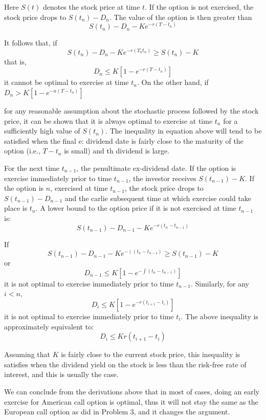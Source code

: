 \documentclass[letterpaper]{article}
\begin{document}
		Here $S(t)$ denotes the stock price at time $t$. If the option is not exercised, the stock price drops to $S\left(t_n\right)-D_n$. The value of the option is then greater than
		$$
		S\left(t_n\right)-D_n-K e^{-r\left(T-t_n\right)}
		$$
		
		It follows that, if
		$$
		S\left(t_n\right)-D_n-K e^{-r\left(T_n t_n\right)} \geqslant S\left(t_n\right)-K
		$$
		that is,
		$$
		D_n \leqslant K\left[1-e^{-r\left(T-t_n\right)}\right]
		$$
		it cannot be optimal to exercise at time $t_n$. On the other hand, if $
		D_n>K\left[1-e^{-n\left(T-t_n\right)}\right]$
		
		for any reasonable assumption about the stochastic process followed by the stock price, it can be shown that it is always optimal to exercise at time $t_n$ for a sufficiently high value of $S\left(t_n\right)$. The inequality in equation above will tend to be satisfied when the final e: dividend date is fairly close to the maturity of the option (i.e., $T-t_n$ is small) and th dividend is large.
		
		For the next time $t_{n-1}$, the penultimate ex-dividend date. If the option is exercise immediately prior to time $t_{n-1}$, the investor receives $S\left(t_{n-1}\right)-K$. If the option is $n$, exercised at time $t_{n-1}$, the stock price drops to $S\left(t_{n-1}\right)-D_{n-1}$ and the carlie subsequent time at which exercise could take place is $t_n$.  A lower bound to the option price if it is not exercised at time $t_{n-1}$ is:
		$$
		S\left(t_{n-1}\right)-D_{n-1}-K e^{-r\left(t_n-t_{n-1}\right)}
		$$
	
	If
		$$
		S\left(t_{n-1}\right)-D_{n-1}-K e^{-\left(\left(t_n-t_{n-1}\right)\right.} \geqslant S\left(t_{n-1}\right)-K
		$$
		or
		$$
		D_{n-1} \leqslant K\left[1-e^{-\int\left(t_n-t_{n-1}\right)}\right]
		$$
		it is not optimal to exercise immediately prior to time $t_{n-1}$. Similarly, for any $i<n$,
		$$
		D_i \leqslant K\left[1-e^{-r\left(t_{i+1}-t_i\right)}\right]
		$$
		it is not optimal to exercise immediately prior to time $t_i$.
		The above inequality is approximately equivalent to:
		$$
		D_i \leqslant K r\left(t_{i+1}-t_i\right)
		$$
		
		Assuming that $K$ is fairly close to the current stock price, this inequality is satisfies when the dividend yield on the stock is less than the risk-free rate of interest, and this is usually the case. 
		
		We can conclude from the derivations above that in most of cases, doing an early exercise for American call option is optimal, thus it will not stay the same as the European call option as did in Problem 3, and it changes the argument. 
				
\end{document}
